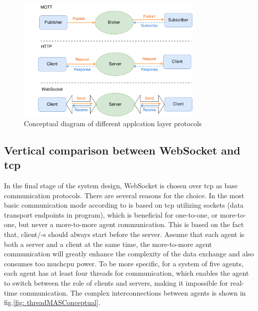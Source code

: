 \begin{figure}[htb]
\includegraphics[width=0.8\textwidth]{figures/MessageConceptual.png}
\centering
\caption{Conceptual diagram of different applcation layer 
protocols\label{fig: MsgConceptual}}
\end{figure}





\subsection{Vertical comparison between WebSocket and \gls{tcp}}
In the final stage of the system design, WebSocket is chosen over \gls{tcp} as 
base communication protocols. There are several reasons for the choice. 
In the most basic communication mode according to \cite{vogel-heuser_delay_2023} 
is based on \gls{tcp} utilizing sockets (data transport endpoints in 
program), which is beneficial for one-to-one, 
or more-to-one, but never a more-to-more agent communication. This is based on 
the fact that, client/-s should always start before the server. Assume that 
each agent is both a server and a client at the same time, the more-to-more 
agent communication will greatly enhance the complexity of the data exchange 
and also consumes too much\gls{cpu} power. To be more specific, for a 
system of five agents, each agent has at least four threads for communication, 
which enables the agent to switch between the role of clients and servers, 
making it impossible for real-time communication. The complex interconnections 
between agents is shown in fig.\ref{fig: threadMASConceptual}.

